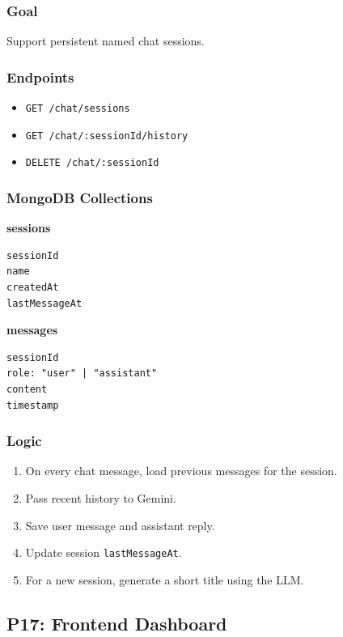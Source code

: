 \documentclass[11pt,a4paper]{article}
\begin{document}
\subsubsection*{Goal}
Support persistent named chat sessions.

\subsubsection*{Endpoints}

\begin{itemize}
  \item \texttt{GET /chat/sessions}
  \item \texttt{GET /chat/:sessionId/history}
  \item \texttt{DELETE /chat/:sessionId}
\end{itemize}

\subsubsection*{MongoDB Collections}

\textbf{sessions}

\begin{lstlisting}
sessionId
name
createdAt
lastMessageAt
\end{lstlisting}

\textbf{messages}

\begin{lstlisting}
sessionId
role: "user" | "assistant"
content
timestamp
\end{lstlisting}

\subsubsection*{Logic}

\begin{enumerate}
  \item On every chat message, load previous messages for the session.
  \item Pass recent history to Gemini.
  \item Save user message and assistant reply.
  \item Update session \texttt{lastMessageAt}.
  \item For a new session, generate a short title using the LLM.
\end{enumerate}

\subsection{P17: Frontend Dashboard}
\end{document}
